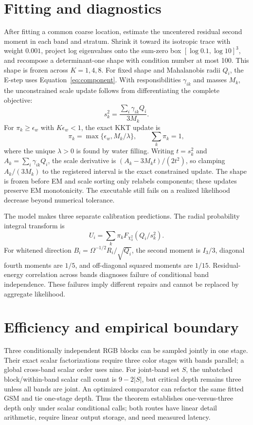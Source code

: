 \documentclass[11pt]{article}
\begin{document}
\section{Fitting and diagnostics}

After fitting a common coarse location, estimate the uncentered residual second moment in each band and stratum.  Shrink it toward its isotropic trace with weight $0.001$, project log eigenvalues onto the sum-zero box $[\log0.1,\log10]^3$, and recompose a determinant-one shape with condition number at most 100.  This shape is frozen across $K=1,4,8$.  For fixed shape and Mahalanobis radii $Q_i$, the E-step uses Equation~\eqref{eq:component}.  With responsibilities $\gamma_{ik}$ and masses $M_k$, the unconstrained scale update follows from differentiating the complete objective:
\begin{equation}
 s_k^2=\frac{\sum_i\gamma_{ik}Q_i}{3M_k}.
\end{equation}
For $\pi_k\ge\epsilon_w$ with $K\epsilon_w<1$, the exact KKT update is
\[
 \pi_k=\max\{\epsilon_w,M_k/\lambda\},\qquad
 \sum_k\pi_k=1,
\]
where the unique $\lambda>0$ is found by water filling.  Writing $t=s_k^2$ and $A_k=\sum_i\gamma_{ik}Q_i$, the scale derivative is $(A_k-3M_kt)/(2t^2)$, so clamping $A_k/(3M_k)$ to the registered interval is the exact constrained update.  The shape is frozen before EM and scale sorting only relabels components; these updates preserve EM monotonicity.  The executable still fails on a realized likelihood decrease beyond numerical tolerance.

The model makes three separate calibration predictions.  The radial probability integral transform is
\begin{equation}
 U_i=\sum_k\pi_kF_{\chi_3^2}(Q_i/s_k^2).
\end{equation}
For whitened direction $B_i=\Omega^{-1/2}R_i/\sqrt{Q_i}$, the second moment is $I_3/3$, diagonal fourth moments are $1/5$, and off-diagonal squared moments are $1/15$.  Residual-energy correlation across bands diagnoses failure of conditional band independence.  These failures imply different repairs and cannot be replaced by aggregate likelihood.

\section{Efficiency and empirical boundary}

Three conditionally independent RGB blocks can be sampled jointly in one stage.  Their exact scalar factorizations require three color stages with bands parallel; a global cross-band scalar order uses nine.  For joint-band set $S$, the unbatched block/within-band scalar call count is $9-2|S|$, but critical depth remains three unless all bands are joint.  An optimized comparator can refactor the same fitted GSM and tie one-stage depth.  Thus the theorem establishes one-versus-three depth only under scalar conditional calls; both routes have linear detail arithmetic, require linear output storage, and need measured latency.
\end{document}
